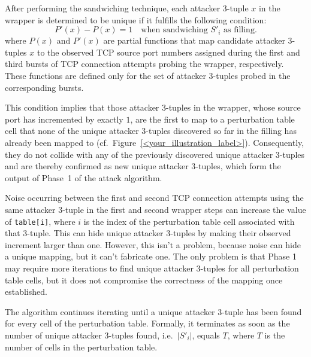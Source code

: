 \documentclass{report}
\begin{document}
After performing the sandwiching technique, each attacker 3-tuple \( x \) in the wrapper is determined to be \alert{unique} if it fulfills the following \alert{condition}:
\begin{equation*}
	P'(x) - P(x) = 1 
  	\quad \text{when sandwiching } S'_i \text{ as filling.}
\end{equation*}
where \(P(x)\) and \(P'(x)\) are partial functions that map \alert{candidate attacker 3-tuples \( x \) to} the observed \alert{TCP source port} numbers assigned during the first and third bursts of TCP connection attempts probing the wrapper, respectively. These functions are defined only for the set of attacker 3-tuples probed in the corresponding bursts.

This \alert{condition implies} that those attacker 3-tuples in the wrapper, whose source port has incremented by exactly $1$, are the first to map to a perturbation table cell that none of the unique attacker 3-tuples discovered so far in the filling has already been mapped to (cf.\ Figure~\ref{<your_illustration_label>}). Consequently, they do not collide with any of the previously discovered unique attacker 3-tuples and are thereby confirmed as new \alert{unique attacker 3-tuples}, which form the \alert{output} of Phase~1 of the attack algorithm.

\alert{Noise} occurring between the first and second TCP connection attempts using the same attacker 3-tuple in the first and second wrapper steps can increase the value of \texttt{table[i]}, where $i$ is the index of the perturbation table cell associated with that 3-tuple. This \alert{can hide} unique attacker 3-tuples by making their observed increment larger than one. However, this isn’t a problem, because noise can hide a unique mapping, but it \alert{can’t fabricate} one. The only problem is that Phase 1 may require more iterations to find unique attacker 3-tuples for all perturbation table cells, but it does not compromise the correctness of the mapping once established.

The algorithm continues iterating until a unique attacker 3-tuple has been found for every cell of the perturbation table. Formally, it \alert{terminates} as soon as the number of unique attacker 3-tuples found, i.e.\ $\lvert S'_i \rvert$, equals $T$, where $T$ is the number of cells in the perturbation table.

\begin{center}
	\begin{minipage}[t]{0.49\textwidth}
		\vspace{0cm}

		
	\end{minipage}
	\begin{minipage}[t]{0.49\textwidth}
		\vspace{0cm}

		
	\end{minipage}
\end{center}
\end{document}

